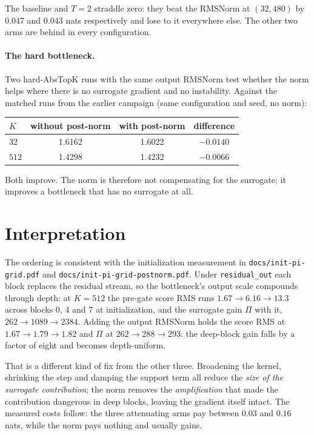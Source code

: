 \documentclass[11pt,a4paper]{article}
\newcommand{\code}[1]{\texttt{#1}}
\begin{document}
The baseline and $T=2$ straddle zero: they beat the RMSNorm at
$(32,480)$ by $0.047$ and $0.043$ nats respectively and lose to it
everywhere else. The other two arms are behind in every configuration.

\paragraph{The hard bottleneck.}
Two hard-AbsTopK runs with the same output RMSNorm test whether the norm
helps where there is no surrogate gradient and no instability. Against the
matched runs from the earlier campaign (same configuration and seed, no
norm):

\begin{center}\small
\begin{tabular}{lccc}
\toprule
$K$ & without post-norm & with post-norm & difference \\
\midrule
$32$  & 1.6162 & 1.6022 & $-0.0140$ \\
$512$ & 1.4298 & 1.4232 & $-0.0066$ \\
\bottomrule
\end{tabular}
\end{center}

Both improve. The norm is therefore not compensating for the surrogate;
it improves a bottleneck that has no surrogate at all.

\section{Interpretation}

The ordering is consistent with the initialization measurement in
\code{docs/init-pi-grid.pdf} and \code{docs/init-pi-grid-postnorm.pdf}.
Under \code{residual\_out} each block replaces the residual stream, so the
bottleneck's output scale compounds through depth: at $K=512$ the pre-gate
score RMS runs $1.67\to6.16\to13.3$ across blocks 0, 4 and 7 at
initialization, and the surrogate gain $\Pi$ with it,
$262\to1089\to2384$. Adding the output RMSNorm holds the score RMS at
$1.67\to1.79\to1.82$ and $\Pi$ at $262\to288\to293$: the deep-block gain
falls by a factor of eight and becomes depth-uniform.

That is a different kind of fix from the other three. Broadening the
kernel, shrinking the step and damping the support term all reduce the
\emph{size of the surrogate contribution}; the norm removes the
\emph{amplification} that made the contribution dangerous in deep blocks,
leaving the gradient itself intact. The measured costs follow: the three
attenuating arms pay between $0.03$ and $0.16$ nats, while the norm pays
nothing and usually gains.
\end{document}
